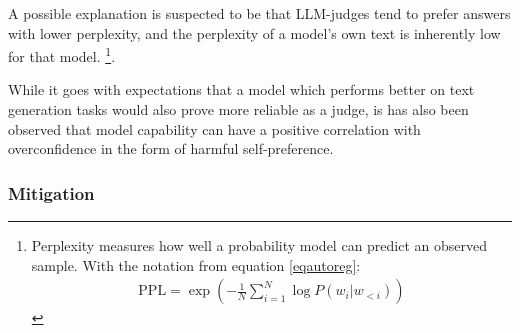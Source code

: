 \documentclass[noindent,nohyp,parspace,titlepage,twoside,12pt]{article}
\begin{document}
      A possible explanation is suspected \cite{biasself} to be that LLM-judges
      tend to prefer answers with lower perplexity, and the perplexity of a
      model's own text is inherently low for that model. \footnote{Perplexity
      measures how well a probability model can predict an observed sample.
      With the notation from equation \ref{eqautoreg}:
      \begin{align*}
        \text{PPL} =  \exp\left(
                        - \frac{1}{N} \sum_{i=1}^N \log P(w_i | w_{<i})
                      \right)
      \end{align*}}.

      While it goes with expectations that a model which performs better on
      text generation tasks would also prove more reliable as a judge, is has
      also been observed \cite{reason} that model capability can have a positive
      correlation with overconfidence in the form of harmful self-preference.

      \subsubsection{Mitigation}
\end{document}
